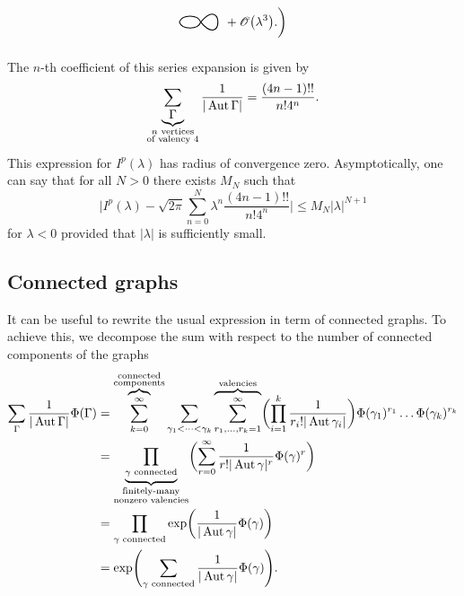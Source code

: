 \begin{example}
\begin{align*}
\begin{tikzpicture}[scale=2, baseline=-1mm]
        \draw[thick] (.3, 0) to[out=-50, in=50, loop] (.3, 0);
        \draw[thick] (0, 0) to[out=70, in=110] (.3, 0);
        \draw[thick] (0, 0) to[out=-70, in=-110] (.3, 0);
      \end{tikzpicture}
      + \Oscr \bigl(\lambda^3\bigr).
    \biggr) 
  \end{align*}
  The $n$-th coefficient of this series expansion is given by
  \begin{equation*}
    \sum_{\underbrace{\Gamma}_{\substack{n\text{ vertices} \\ \text{of valency } 4}}} \frac{1}{|\operatorname{Aut} \Gamma|}
    = \frac{(4n - 1)!!}{n! 4^n}.
  \end{equation*}
  This expression for $I^p (\lambda)$ has radius of convergence zero. Asymptotically, one can say that for all $N > 0$ there exists $M_N$ such that
  \begin{equation*}
    \biggl| I^p(\lambda) - \sqrt{2 \pi} \sum_{n=0}^N \lambda^n \frac{(4n - 1)!!}{n! 4^n} \biggr|
    \leq M_N |\lambda|^{N + 1}
  \end{equation*}
  for $\lambda < 0$ provided that $|\lambda|$ is sufficiently small.
\end{example}

\subsection{Connected graphs}

It can be useful to rewrite the usual expression in term of connected graphs. To achieve this, we decompose the sum with respect to the number of connected components of the graphs
\begin{align*}
  \sum_{\Gamma} \frac{1}{|\operatorname{Aut} \Gamma|} \Phi(\Gamma)
  &= \overbrace{\sum_{k = 0}^\infty}^{\substack{\text{connected}\\ \text{components}}}
  \sum_{\gamma_1 < \dots < \gamma_k}
  \overbrace{\sum_{r_1, \dots, r_k = 1}^\infty}^{\text{valencies}}
  \biggl( \prod_{i=1}^k \frac{1}{r_i! |\operatorname{Aut} \gamma_i|} \biggr) \Phi(\gamma_1)^{r_1} \dots \Phi(\gamma_k)^{r_k} \\
  &= \underbrace{\prod_{\gamma \text{ connected}}}_{\substack{\text{finitely-many} \\ \text{nonzero valencies}}}
    \biggl( \sum_{r=0}^\infty \frac{1}{r! |\operatorname{Aut} \gamma|^r} \Phi(\gamma)^r \biggr) \\
  &= \prod_{\gamma \text{ connected}} \exp \biggl( \frac{1}{|\operatorname{Aut} \gamma|} \Phi(\gamma) \biggr) \\
  &= \exp \Biggl( \sum_{\gamma \text{ connected}} \frac{1}{|\operatorname{Aut} \gamma|} \Phi(\gamma) \Biggr).
\end{align*}

